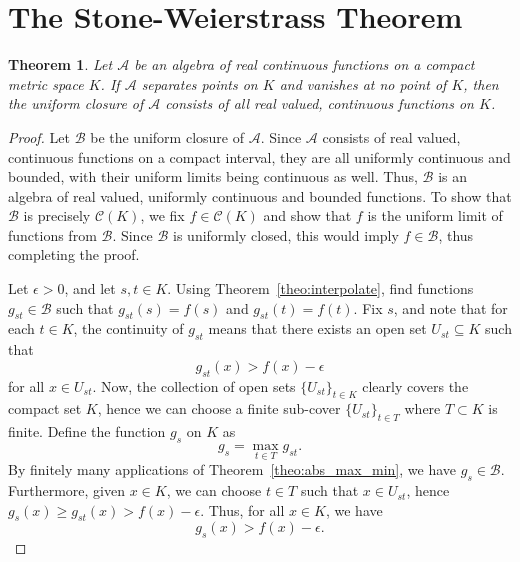 \documentclass[11pt]{article}
\newtheorem{theorem}{Theorem}[section]
\theoremstyle{definition}
\theoremstyle{remark}
\begin{document}
    \section{The Stone-Weierstrass Theorem}
    \begin{theorem} \label{theo:stone_weierstrass}
        Let $\mathscr{A}$ be an algebra of real continuous functions on a compact
        metric space $K$. If $\mathscr{A}$ separates points on $K$ and vanishes at no
        point of $K$, then the uniform closure of $\mathscr{A}$ consists of all real
        valued, continuous functions on $K$.
    \end{theorem}
    \begin{proof}
        Let $\mathscr{B}$ be the uniform closure of $\mathscr{A}$. Since
        $\mathscr{A}$ consists of real valued, continuous functions on a compact
        interval, they are all uniformly continuous and bounded, with their uniform
        limits being continuous as well. Thus, $\mathscr{B}$ is an algebra of real
        valued, uniformly continuous and bounded functions. To show that
        $\mathscr{B}$ is precisely $\mathscr{C}(K)$, we fix $f \in \mathscr{C}(K)$
        and show that $f$ is the uniform limit of functions from $\mathscr{B}$. Since
        $\mathscr{B}$ is uniformly closed, this would imply $f \in \mathscr{B}$, thus
        completing the proof.

        Let $\epsilon > 0$, and let $s, t \in K$. Using
        Theorem~\ref{theo:interpolate}, find functions $g_{st} \in \mathscr{B}$ such
        that $g_{st}(s) = f(s)$ and $g_{st}(t) = f(t)$. Fix $s$, and note that for
        each $t \in K$, the continuity of $g_{st}$ means that there exists an open
        set $U_{st} \subseteq K$ such that \[
            g_{st}(x) > f(x) - \epsilon
        \] for all $x \in U_{st}$. Now, the collection of open sets $\{U_{st}\}_{t
        \in K}$ clearly covers the compact set $K$, hence we can choose a finite
        sub-cover $\{U_{st}\}_{t \in T}$ where $T \subset K$ is finite.
        Define the function $g_s$ on $K$ as \[
            g_s = \max_{t \in T} g_{st}.
        \] By finitely many applications of Theorem~\ref{theo:abs_max_min}, we have
        $g_s \in \mathscr{B}$. Furthermore, given $x \in K$, we can choose $t \in T$
        such that $x \in U_{st}$, hence $g_s(x) \geq g_{st}(x) > f(x) - \epsilon$.
        Thus, for all $x \in K$, we have \[
            g_s(x) > f(x) - \epsilon.
        \] 
        

\end{proof}
\end{document}
